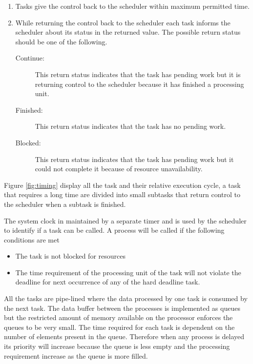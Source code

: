 \begin{enumerate}
\item Tasks give the control back to the scheduler within maximum permitted time.
\item  While returning the control back to the scheduler each task informs the scheduler about its status in the returned value. The possible return status should be one of the following.

\begin{description}

\item [Continue:] This return status indicates that the task has pending work but it is returning control to the scheduler because it has finished a processing unit.
\item [Finished:] This return status indicates that the task has no pending work.
\item [Blocked:] This return status indicates that the task has pending work but it could not complete it because of resource unavailability.
\end{description}
\end{enumerate}

Figure \ref{fig:timing} display all the task and their relative execution cycle, a task that requires a long time are divided into small subtasks that return control to the scheduler when a subtask is finished.

The system clock in maintained by a separate timer and is used by the scheduler to identify if a task can be called. A process will be called if the following conditions are met
\begin{itemize}
\item The task is not blocked for resources
\item The time requirement of the processing unit of the task will not violate the deadline for next occurrence of any of the hard deadline task.
\end{itemize}

All the tasks are pipe-lined where the data processed by one task is consumed by the next task. The data buffer between the processes is implemented as queues but the restricted amount of memory available on the processor enforces the queues to be very small. The time required for each task is dependent on the number of elements present in the queue. Therefore when any process is delayed its priority will increase because the queue is less empty and the processing requirement increase as the queue is more filled.
